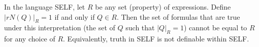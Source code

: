 In the language SELF, let $R$ be any set (property) of expressions. Define $|rN(Q)|_R = 1$ if and only if $Q \in R$. Then the set of formulas that are true under this interpretation (the set of $Q$ such that $|Q|_R = 1$) cannot be equal to $R$ for any choice of $R$. Equivalently, truth in SELF is not definable within SELF.
